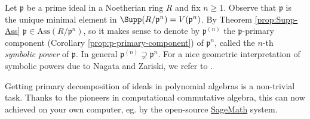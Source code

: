 \begin{example}
	Let $\mathfrak{p}$ be a prime ideal in a Noetherian ring $R$ and fix $n \geq 1$. Observe that $\mathfrak{p}$ is the unique minimal element in $\Supp(R/\mathfrak{p}^n) = V(\mathfrak{p}^n)$. By Theorem \ref{prop:Supp-Ass} $\mathfrak{p} \in \text{Ass}(R/\mathfrak{p}^n)$, so it makes sense to denote by $\mathfrak{p}^{(n)}$ the $\mathfrak{p}$-primary component (Corollary \ref{prop:p-primary-component}) of $\mathfrak{p}^n$, called the $n$-th \emph{symbolic power} of $\mathfrak{p}$. In general $\mathfrak{p}^{(n)} \supsetneq \mathfrak{p}^n$. For a nice geometric interpretation of symbolic powers due to Nagata and Zariski, we refer to \cite[\S 3.9]{Eis95}.
\end{example}

Getting primary decomposition of ideals in polynomial algebras is a non-trivial task. Thanks to the pioneers in computational commutative algebra, this can now achieved on your own computer, eg. by the open-source \href{http://www.sagemath.org}{SageMath} system.
